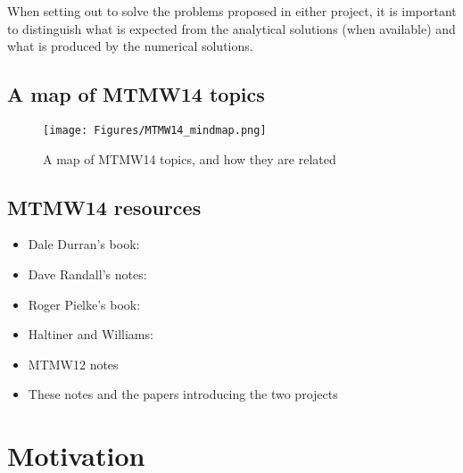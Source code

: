 \documentclass[11pt,fleqn]{book} %
\begin{document}
\vspace{1em}

\vspace{1em}

\vspace{1em}
		
When setting out to solve the problems proposed in either project, it is important to distinguish what is expected from the analytical solutions (when available) and what is produced by the numerical solutions.
	
	\subsection{A map of MTMW14 topics}
	\begin{figure}[h!]
	\texttt{[image: Figures/MTMW14\_mindmap.png]}
	\caption{A map of MTMW14 topics, and how they are related}
	\end{figure}
	
	\subsection{MTMW14 resources}
	
	\begin{itemize}
		\item	Dale Durran's book:  \cite {Durran-book}
		\item	Dave Randall's notes:  \cite{Randall-notes}
		\item   Roger Pielke's book:  \cite {Pielke-book}
		\item   Haltiner and Williams:  \cite {Haltiner-Williams-book}
		\item	MTMW12 notes
		\item	These notes and the papers introducing the two projects		
	\end{itemize}
	
	\section{Motivation}
	
\end{document}
